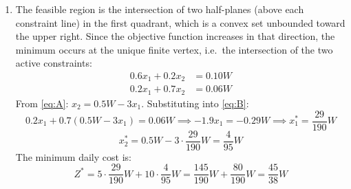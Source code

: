 \documentclass[12pt,a4paper]{article}
\makeatletter
\newtheorem*{solution}{Solution}
\theoremstyle{definition}
\renewenvironment{solution}[1][Solution] {\par\pushQED{\qed}\normalfont\topsep6\p@\@plus6\p@\relax\trivlist\item[\hskip\labelsep\bfseries#1\@addpunct{.}]\ignorespaces}{\popQED\endtrivlist\@endpefalse} \makeatother
\makeatother
\begin{document}
\begin{enumerate}
\begin{solution}
\begin{enumerate}
        The feasible region is the intersection of two half-planes 
        (above each constraint line) in the first quadrant, which is 
        a convex set unbounded toward the upper right. Since the 
        objective function increases in that direction, the minimum 
        occurs at the unique finite vertex, i.e.\ the intersection 
        of the two active constraints:
        \begin{align}
            0.6x_1 + 0.2x_2 &= 0.10W \label{eq:A}\\
            0.2x_1 + 0.7x_2 &= 0.06W \label{eq:B}
        \end{align}
        From \eqref{eq:A}: $x_2 = 0.5W - 3x_1$. Substituting into \eqref{eq:B}:
        \[
            0.2x_1 + 0.7(0.5W - 3x_1) = 0.06W
            \implies -1.9x_1 = -0.29W
            \implies x_1^* = \frac{29}{190}W
        \]
        \[
            x_2^* = 0.5W - 3\cdot\frac{29}{190}W = \frac{4}{95}W
        \]
        The minimum daily cost is:
        \[
            Z^* = 5\cdot\frac{29}{190}W + 10\cdot\frac{4}{95}W
                = \frac{145}{190}W + \frac{80}{190}W
                = \frac{45}{38}W
        \]
    \end{enumerate}
    \end{solution}


    
\end{enumerate}
\end{document}
